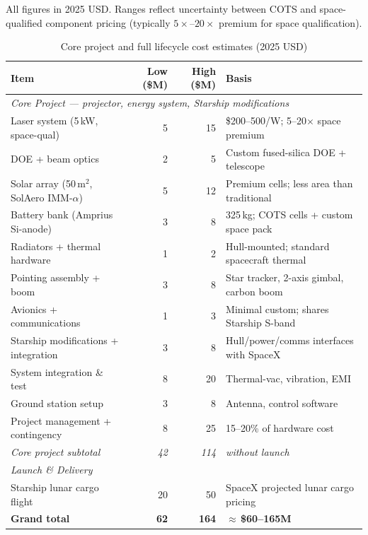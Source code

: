 \documentclass[10pt,letterpaper]{article}
\begin{document}
All figures in 2025 USD. Ranges reflect uncertainty between COTS and
space-qualified component pricing (typically $5\times$--$20\times$ premium for
space qualification).

\begin{table}[!ht]
\centering\small
\caption{Core project and full lifecycle cost estimates (2025 USD)}
\label{tab:costs}
\begin{tabular}{lrrl}
\toprule
\textbf{Item} & \textbf{Low (\$M)} & \textbf{High (\$M)} & \textbf{Basis} \\
\midrule
\multicolumn{4}{l}{\textit{Core Project --- projector, energy system, Starship modifications}} \\
\midrule
Laser system (5\,kW, space-qual) & 5 & 15 & \$200--500/W; 5--20$\times$ space premium \\
DOE + beam optics & 2 & 5 & Custom fused-silica DOE + telescope \\
Solar array (50\,m$^2$, SolAero IMM-$\alpha$) & 5 & 12 & Premium cells; less area than traditional \\
Battery bank (Amprius Si-anode) & 3 & 8 & 325\,kg; COTS cells + custom space pack \\
Radiators + thermal hardware & 1 & 2 & Hull-mounted; standard spacecraft thermal \\
Pointing assembly + boom & 3 & 8 & Star tracker, 2-axis gimbal, carbon boom \\
Avionics + communications & 1 & 3 & Minimal custom; shares Starship S-band \\
Starship modifications + integration & 3 & 8 & Hull/power/comms interfaces with SpaceX \\
System integration \& test & 8 & 20 & Thermal-vac, vibration, EMI \\
Ground station setup & 3 & 8 & Antenna, control software \\
Project management + contingency & 8 & 25 & 15--20\% of hardware cost \\
\midrule
\textit{Core project subtotal} & \textit{42} & \textit{114} & \textit{without launch} \\
\midrule
\multicolumn{4}{l}{\textit{Launch \& Delivery}} \\
\midrule
Starship lunar cargo flight & 20 & 50 & SpaceX projected lunar cargo pricing \\
\midrule
\textbf{Grand total} & \textbf{62} & \textbf{164} & \textbf{$\approx$\,\$60--165M} \\
\bottomrule
\end{tabular}
\end{table}
\end{document}
